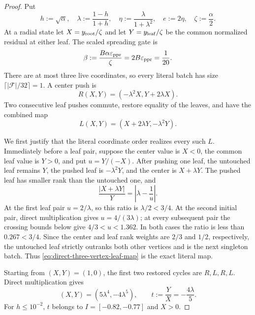 \begin{proof}
Put
\begin{equation*}
 h:=\sqrt\alpha,
 \quad \lambda:=\frac{1-h}{1+h},
 \quad \eta:=\frac{\lambda}{1+\lambda^2},
 \quad e:=2\eta,
 \quad \zeta:=\frac\alpha2.
\end{equation*}
At a radial state let $X=y_{\rm root}/\zeta$ and let
$Y=y_{\rm leaf}/\zeta$ be the common normalized residual at either leaf.
The scaled spreading gate is
\begin{equation*}
 \beta:=\frac{B\alpha\varepsilon_{\mathrm{ppr}}}{\zeta}
 =2B\varepsilon_{\mathrm{ppr}}=\frac1{20}.
\end{equation*}
There are at most three live coordinates, so every literal batch has size
$\lceil|\mathcal F|/32\rceil=1$.  A center push is
\begin{equation}
 R(X,Y)=(-\lambda^2X,Y+2\lambda X).
 \label{eq:direct-three-vertex-root-map}
\end{equation}
Two consecutive leaf pushes commute, restore equality of the leaves, and
have the combined map
\begin{equation}
 L(X,Y)=(X+2\lambda Y,-\lambda^2Y).
 \label{eq:direct-three-vertex-leaf-map}
\end{equation}

We first justify that the literal coordinate order realizes every such $L$.
Immediately before a leaf pair, suppose the center value is $X<0$, the
common leaf value is $Y>0$, and put $u=Y/(-X)$.  After pushing one leaf, the
untouched leaf remains $Y$, the pushed leaf is $-\lambda^2Y$, and the center
is $X+\lambda Y$.  The pushed leaf has smaller rank than the untouched one,
and
\begin{equation}
 \frac{|X+\lambda Y|}{Y}
 =\left|\lambda-\frac1u\right|.
 \label{eq:direct-three-vertex-between-leaves}
\end{equation}
At the first leaf pair $u=2/\lambda$, so this ratio is $\lambda/2<3/4$.
At the second initial pair, direct multiplication gives
$u=4/(3\lambda)$; at every subsequent pair the crossing bounds below give
$4/3<u<1.362$.  In both cases the ratio is less than $0.267<3/4$.  Since the center and
leaf rank weights are $2/3$ and $1/2$, respectively, the untouched leaf
strictly outranks both other vertices and is the next singleton batch.
Thus \cref{eq:direct-three-vertex-leaf-map} is the exact literal map.

Starting from $(X,Y)=(1,0)$, the first two restored cycles are
$R,L,R,L$.  Direct multiplication gives
\begin{equation}
 (X,Y)=(5\lambda^4,-4\lambda^5),
 \qquad t:=\frac YX=-\frac{4\lambda}{5}.
 \label{eq:direct-three-vertex-entry-state}
\end{equation}
For $h\leq10^{-2}$, $t$ belongs to $I=[-0.82,-0.77]$ and $X>0$.


\end{proof}
